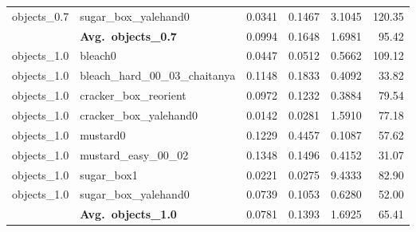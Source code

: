 \begin{longtable}{llrrrr}
  objects_0.7 & sugar\_box\_yalehand0 & 0.0341 & 0.1467 & 3.1045 & 120.35 \\
  \cmidrule{2-6}
  & \textbf{Avg.~objects_0.7} & 0.0994 & 0.1648 & 1.6981 & 95.42 \\
  \midrule
  objects_1.0 & bleach0 & 0.0447 & 0.0512 & 0.5662 & 109.12 \\
  objects_1.0 & bleach\_hard\_00\_03\_chaitanya & 0.1148 & 0.1833 & 0.4092 & 33.82 \\
  objects_1.0 & cracker\_box\_reorient & 0.0972 & 0.1232 & 0.3884 & 79.54 \\
  objects_1.0 & cracker\_box\_yalehand0 & 0.0142 & 0.0281 & 1.5910 & 77.18 \\
  objects_1.0 & mustard0 & 0.1229 & 0.4457 & 0.1087 & 57.62 \\
  objects_1.0 & mustard\_easy\_00\_02 & 0.1348 & 0.1496 & 0.4152 & 31.07 \\
  objects_1.0 & sugar\_box1 & 0.0221 & 0.0275 & 9.4333 & 82.90 \\
  objects_1.0 & sugar\_box\_yalehand0 & 0.0739 & 0.1053 & 0.6280 & 52.00 \\
  \cmidrule{2-6}
  & \textbf{Avg.~objects_1.0} & 0.0781 & 0.1393 & 1.6925 & 65.41 \\
  \midrule
\bottomrule
\end{longtable}